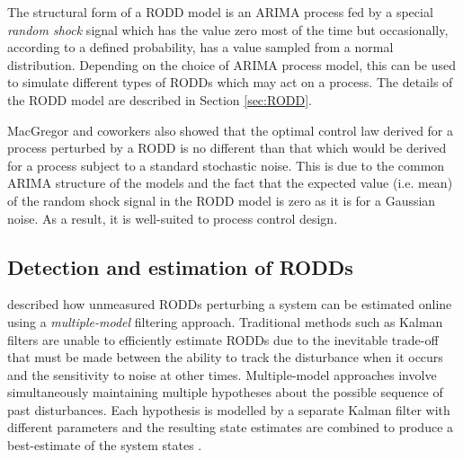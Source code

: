 The structural form of a \gls{RODD} model is an \gls{ARIMA} process fed by a special \textit{random shock} signal which has the value zero most of the time but occasionally, according to a defined probability, has a value sampled from a normal distribution. Depending on the choice of \gls{ARIMA} process model, this can be used to simulate different types of \gls{RODD}s which may act on a process. The details of the \gls{RODD} model are described in Section \ref{sec:RODD}.

MacGregor and coworkers also showed that the optimal control law derived for a process perturbed by a \gls{RODD} is no different than that which would be derived for a process subject to a standard stochastic noise.  This is due to the common \gls{ARIMA} structure of the models and the fact that the expected value (i.e. mean) of the random shock signal in the \gls{RODD} model is zero as it is for a Gaussian noise. As a result, it is well-suited to process control design.

\subsection{Detection and estimation of RODDs} \label{detection_RODDs}

\cite{robertson_detection_1995} described how unmeasured \gls{RODD}s perturbing a system can be estimated online using a \textit{multiple-model} filtering approach. Traditional methods such as Kalman filters are unable to efficiently estimate \gls{RODD}s due to the inevitable trade-off that must be made between the ability to track the disturbance when it occurs and the sensitivity to noise at other times. Multiple-model approaches involve simultaneously maintaining multiple hypotheses about the possible sequence of past disturbances. Each hypothesis is modelled by a separate Kalman filter with different parameters and the resulting state estimates are combined to produce a best-estimate of the system states \citep{jaffer_estimation_1971, buxbaum_recursive_1969, tugnait_detection_1982}.

